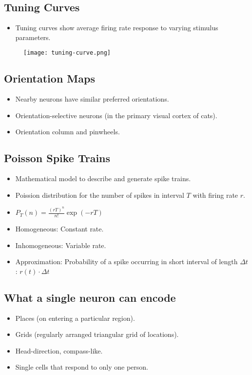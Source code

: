 \documentclass[main]{subfiles}
\begin{document}
\subsection{Tuning Curves}
\begin{itemize}[noitemsep,nolistsep]
	\item Tuning curves show average firing rate response to varying stimulus parameters.
\end{itemize}
\begin{figure}[H]
	\centering
	\texttt{[image: tuning-curve.png]}
\end{figure}

\subsection{Orientation Maps}
\begin{itemize}[noitemsep,nolistsep]
	\item Nearby neurons have similar preferred orientations.
	\item Orientation-selective neurons (in the primary visual cortex of cats).
	\item Orientation column and pinwheels.
\end{itemize}

\subsection{Poisson Spike Trains}
\begin{itemize}[noitemsep,nolistsep]
	\item Mathematical model to describe and generate spike trains.
	\item Poission distribution for the number of spikes in interval $T$ with firing rate $r$.
	\item $P_T(n)=\frac{(rT)^n}{n!}\exp(-rT)$
	\item Homogeneous: Constant rate.
	\item Inhomogeneous: Variable rate.
	\item Approximation: Probability of a spike occurring in short interval of length $\Delta t$: $r(t)\cdot\Delta t$
\end{itemize}

\subsection{What a single neuron can encode}
\begin{itemize}[noitemsep,nolistsep]
	\item Places (on entering a particular region).
	\item Grids (regularly arranged triangular grid of locations).
	\item Head-direction, compass-like.
	\item Single cells that respond to only one person.
\end{itemize}
\end{document}
